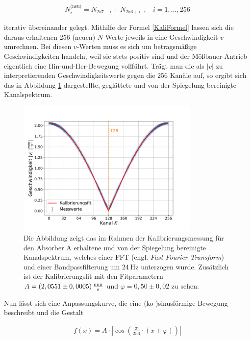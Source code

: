 \documentclass[
a4paper,                %
titlepage=firstiscover, %
captions=tableheading,  %
toc=bibliography,       %
toc=listof,             %
oneside,                %
automark,               %
12pt,                   %
english, ngerman,       %
parskip = half,         %
]{scrartcl}
\begin{document}
\begin{align}
N_{i}^{\text{(neu)}} = N_{257-i} + N_{256+i} \ \ , \ \ \ \ i=1,\dotsc ,256
\end{align}

\noindent iterativ übereinander gelegt.
Mithilfe der Formel \ref{KaliFormel} lassen sich die daraus erhaltenen $256$ (neuen) $N$-Werte jeweils in eine Geschwindigkeit $v$ umrechnen.
Bei diesen $v$-Werten muss es sich um betragsmäßige Geschwindigkeiten handeln, weil sie stets positiv sind und der Mößbauer-Antrieb eigentlich eine Hin-und-Her-Bewegung vollführt.
Trägt man die als $|v|$ zu interpretierenden Geschwindigkeitswerte gegen die $256$ Kanäle auf, so ergibt sich das in Abbildung \ref{KanalspektrumA} dargestellte, geglättete und von der Spiegelung bereinigte Kanalspektrum.

\begin{figure}[H]
	\centering
	\includegraphics[width=0.8\textwidth]{raw/KanalspektrumA}
	\caption{Die Abbildung zeigt das im Rahmen der Kalibrierungsmessung für den Absorber A erhaltene und von der Spiegelung bereinigte Kanalspektrum, welches einer FFT (engl. \emph{Fast Fourier Transform}) und einer Bandpassfilterung um $\SI{24}{\hertz}$ unterzogen wurde. Zusätzlich ist der Kalibrierungsfit mit den Fitparametern $A=(2,0551\pm 0,0005)\,\frac{\textnormal{mm}}{\textnormal{s}}$ und $\varphi=0,50\pm 0,02$ zu sehen.}
	\label{KanalspektrumA}
\end{figure}

\noindent Nun lässt sich eine Anpassungskurve, die eine (ko-)sinusförmige Bewegung beschreibt und die Gestalt

\begin{align} \label{KaliFit}
f(x)=A\cdot\left|\cos\left(\frac{\pi}{256}\cdot (x+\varphi)\right)\right| 
\end{align}
\end{document}
